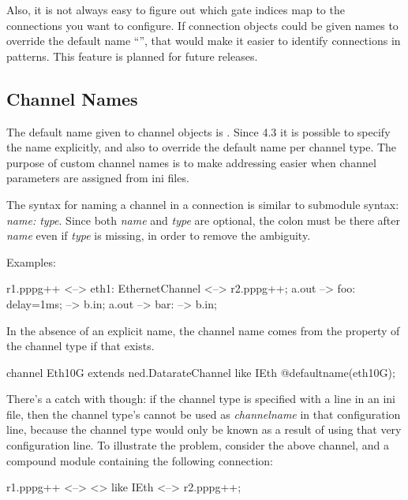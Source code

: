 Also, it is not always easy to figure out which gate indices map to the
connections you want to configure. If connection objects could be given
names to override the default name ``'', that would make it
easier to identify connections in patterns. This feature is planned for
future {\opp} releases.


\subsection{Channel Names}
\label{sec:ned-lang:channel-names}

The default name given to channel objects is . Since {\opp} 4.3
it is possible to specify the name explicitly, and also to override
the default name per channel type. The purpose of custom channel names is to make
addressing easier when channel parameters are assigned from ini files.

The syntax for naming a channel in a connection is similar to submodule syntax:
\textit{name: type}. Since both \textit{name} and \textit{type} are optional,
the colon must be there after \textit{name} even if \textit{type} is missing,
in order to remove the ambiguity.

Examples:

\begin{ned}
r1.pppg++ <--> eth1: EthernetChannel <--> r2.pppg++;
a.out --> foo: {delay=1ms;} --> b.in;
a.out --> bar: --> b.in;
\end{ned}

In the absence of an explicit name, the channel name comes from the
 property of the channel type if that exists.

\begin{ned}
channel Eth10G extends ned.DatarateChannel like IEth {
    @defaultname(eth10G);
}
\end{ned}

There's a catch with  though: if the channel type is
specified with a  line in an ini file, then
the channel type's  cannot be used as \textit{channelname}
in that configuration line, because the channel type would only be known as a
result of using that very configuration line. To illustrate the problem,
consider the above  channel, and a compound module containing the
following connection:

\begin{ned}
r1.pppg++ <--> <> like IEth <--> r2.pppg++;
\end{ned}

